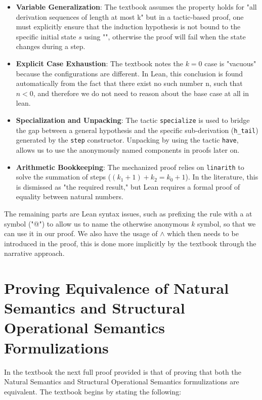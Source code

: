 \begin{itemize}
    \item \textbf{Variable Generalization}:
    The textbook assumes the property holds for "all derivation sequences of length at most k"
    but in a tactic-based proof, one must explicitly ensure that the induction
    hypothesis is not bound to the specific initial state \(s\) using "",
    otherwise the proof will fail when the state changes during a step.

    \item \textbf{Explicit Case Exhaustion}:
    The textbook notes the \(k=0\) case is
    "vacuous" because the configurations are different.
    In Lean, this conclusion is found automatically from the fact that there exist no such number n,
    such that \(n < 0\), and therefore we do not need to reason about the base case at all in lean.

    \item \textbf{Specialization and Unpacking}:
    The tactic \texttt{specialize} is used to bridge the gap
    between a general hypothesis and the specific sub-derivation (\texttt{h\_tail})
    generated by the \texttt{step} constructor.
    Unpacking by using the tactic \texttt{have},
    allows us to use the anonymously named components in proofs later on.

    \item \textbf{Arithmetic Bookkeeping}:
    The mechanized proof relies on \texttt{linarith}
    to solve the summation of steps (\((k_1 + 1) + k_2 = k_0 + 1\)). In the literature,
    this is dismissed as "the required result," but Lean requires a formal
    proof of equality between natural numbers.
\end{itemize}
The remaining parts are Lean syntax issues,
such as prefixing the rule with a at symbol ("@") to allow us
to name the otherwise anonymous \(k\) symbol, so that we can use it in our proof.
We also have the usage of \(\land\) which then needs to be introduced in the proof,
this is done more implicitly by the textbook through the narrative approach.


%
%
%
\section{Proving Equivalence of Natural Semantics and Structural Operational Semantics Formulizations}
\label{formal_ns_sos_equiv:sec:ns_equiv_sos}
In the textbook the next full proof provided is that of proving
that both the Natural Semantics and Structural Operational Semantics formulizations are equivalent.
The textbook begins by stating the following:

